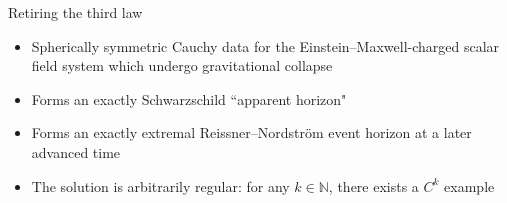 \documentclass[compress,usenames,dvipsnames,8pt]{beamer}
\theoremstyle{definition}
\renewcommand{\(}{\begin{columns}}
\renewcommand{\)}{\end{columns}}
\newcommand{\<}[1]{\begin{column}{#1}}
\renewcommand{\>}{\end{column}}
\begin{document}

\begin{frame}{Retiring the third law}

\begin{figure}
 \def\svgwidth{15pc}

\end{figure}

\begin{itemize}
\item Spherically symmetric Cauchy data for the Einstein--Maxwell-charged scalar field system which undergo gravitational collapse \pause

\item Forms an exactly Schwarzschild ``apparent horizon"

\item  Forms an exactly extremal Reissner--Nordstr\"om event horizon at a later advanced time \pause

\item The solution is arbitrarily regular: for any $k\in\mathbb N$, there exists a $C^k$ example
\end{itemize}


\end{frame}
\end{document}
